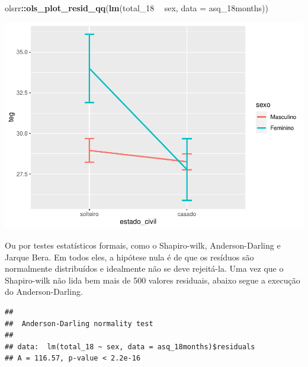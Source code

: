 \documentclass[
]{book}
\newenvironment{Shaded}{\begin{snugshade}}{\end{snugshade}}
\newcommand{\DataTypeTok}[1]{\textcolor[rgb]{0.13,0.29,0.53}{#1}}
\newcommand{\DecValTok}[1]{\textcolor[rgb]{0.00,0.00,0.81}{#1}}
\newcommand{\KeywordTok}[1]{\textcolor[rgb]{0.13,0.29,0.53}{\textbf{#1}}}
\newcommand{\NormalTok}[1]{#1}
\newcommand{\OperatorTok}[1]{\textcolor[rgb]{0.81,0.36,0.00}{\textbf{#1}}}
\newcommand{\StringTok}[1]{\textcolor[rgb]{0.31,0.60,0.02}{#1}}
\begin{document}
\begin{Shaded}
\begin{Highlighting}[]
\NormalTok{olsrr}\OperatorTok{::}\KeywordTok{ols_plot_resid_qq}\NormalTok{(}\KeywordTok{lm}\NormalTok{(total_}\DecValTok{18} \OperatorTok{~}\StringTok{ }\NormalTok{sex, }\DataTypeTok{data =}\NormalTok{ asq_18months))}
\end{Highlighting}
\end{Shaded}

\begin{center}\includegraphics{gitbook-demo_files/figure-latex/unnamed-chunk-71-1} \end{center}

Ou por testes estatísticos formais, como o Shapiro-wilk, Anderson-Darling e Jarque Bera. Em todos eles, a hipótese nula é de que os resíduos são normalmente distribuídos e idealmente não se deve rejeitá-la. Uma vez que o Shapiro-wilk não lida bem mais de 500 valores residuais, abaixo segue a execução do Anderson-Darling.

\begin{Shaded}
\end{Shaded}

\begin{verbatim}
## 
##  Anderson-Darling normality test
## 
## data:  lm(total_18 ~ sex, data = asq_18months)$residuals
## A = 116.57, p-value < 2.2e-16
\end{verbatim}
\end{document}
